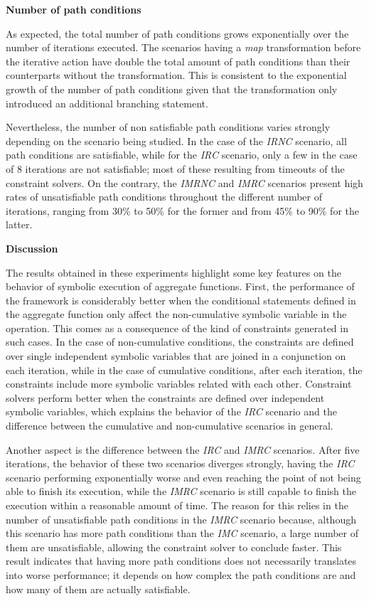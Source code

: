 \textbf{Number of path conditions}

As expected, the total number of path conditions grows exponentially over the number of iterations executed. The scenarios having a \textit{map} transformation before the iterative action have double the total amount of path conditions than their counterparts without the transformation. This is consistent to the exponential growth of the number of path conditions given that the transformation only introduced an additional branching statement.

Nevertheless, the number of non satisfiable path conditions varies strongly depending on the scenario being studied. In the case of the \textit{IRNC} scenario, all path conditions are satisfiable, while for the \textit{IRC} scenario, only a few in the case of 8 iterations are not satisfiable; most of these resulting from timeouts of the constraint solvers. On the contrary, the \textit{IMRNC} and \textit{IMRC} scenarios present high rates of unsatisfiable path conditions throughout the different number of iterations, ranging from 30\% to 50\% for the former and from 45\% to 90\% for the latter.

\textbf{Discussion}

The results obtained in these experiments highlight some key features on the behavior of symbolic execution of aggregate functions. First, the performance of the framework is considerably better when the conditional statements defined in the aggregate function only affect the non-cumulative symbolic variable in the operation. This comes as a consequence of the kind of constraints generated in such cases. In the case of non-cumulative conditions, the constraints are defined over single independent symbolic variables that are joined in a conjunction on each iteration, while in the case of cumulative conditions, after each iteration, the constraints include more symbolic variables related with each other. Constraint solvers perform better when the constraints are defined over independent symbolic variables, which explains the behavior of the \textit{IRC} scenario and the difference between the cumulative and non-cumulative scenarios in general.

Another aspect is the difference between the \textit{IRC} and \textit{IMRC} scenarios. After five iterations, the behavior of these two scenarios diverges strongly, having the \textit{IRC} scenario performing exponentially worse and even reaching the point of not being able to finish its execution, while the \textit{IMRC} scenario is still capable to finish the execution within a reasonable amount of time. The reason for this relies in the number of unsatisfiable path conditions in the \textit{IMRC} scenario because, although this scenario has more path conditions than the \textit{IMC} scenario, a large number of them are unsatisfiable, allowing the constraint solver to conclude faster. This result indicates that having more path conditions does not necessarily translates into worse performance; it depends on how complex the path conditions are and how many of them are actually satisfiable.

